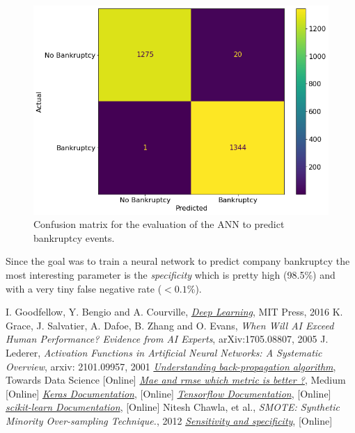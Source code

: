 \begin{figure}[htbp]
\centering
\includegraphics[width=0.7\linewidth]{figures/confusion_matrix}
\caption{Confusion matrix for the evaluation of the ANN to predict bankruptcy events.}
\label{fig:confusion_matrix}
\end{figure}

Since the goal was to train a neural network to predict company bankruptcy the most interesting parameter is the \emph{specificity} which is pretty high (98.5\%) and with a very tiny false negative rate ($\lt 0.1\%$).
 
\begin{thebibliography}{9}
 I. Goodfellow, Y. Bengio and A. Courville, \href{http://www.deeplearningbook.org}{\emph{Deep Learning}}, MIT Press, 2016
K. Grace, J. Salvatier, A. Dafoe, B. Zhang and O. Evans, \emph{When Will AI Exceed Human Performance? Evidence from AI Experts}, arXiv:1705.08807, 2005
 J. Lederer, \emph{Activation Functions in Artificial Neural Networks: A Systematic Overview}, arxiv: 2101.09957, 2001
\href{https://towardsdatascience.com/understanding-backpropagation-algorithm-7bb3aa2f95fd}{\emph{Understanding back-propagation algorithm}}, Towards Data Science [Online]
\href{https://medium.com/human-in-a-machine-world/mae-and-rmse-which-metric-is-better-e60ac3bde13d}{\emph{Mae and rmse which metric is better ?}}, Medium [Online]
\href{https://keras.io/}{\emph{Keras Documentation}}, [Online]  
\href{https://www.tensorflow.org/}{\emph{Tensorflow Documentation}}, [Online] 
\href{https://scikit-learn.org/stable/}{\emph{scikit-learn Documentation}}, [Online]
Nitesh Chawla, et al., \emph{SMOTE: Synthetic Minority Over-sampling Technique.}, 2012
\href{https://en.wikipedia.org/wiki/Sensitivity_and_specificity}{\emph{Sensitivity and specificity}}, [Online]
\end{thebibliography}